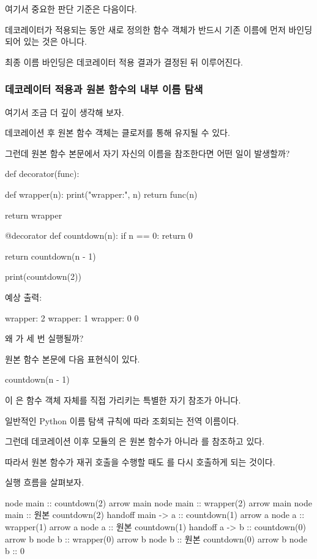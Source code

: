 여기서 중요한 판단 기준은 다음이다.

데코레이터가 적용되는 동안 새로 정의한 함수 객체가 반드시 기존 이름에 먼저 바인딩되어 있는 것은 아니다.

최종 이름 바인딩은 데코레이터 적용 결과가 결정된 뒤 이루어진다.

\subsubsection{데코레이터 적용과 원본 함수의 내부 이름 탐색}

여기서 조금 더 깊이 생각해 보자.

데코레이션 후 원본 함수 객체는 클로저를 통해 유지될 수 있다.

그런데 원본 함수 본문에서 자기 자신의 이름을 참조한다면 어떤 일이 발생할까?

\begin{dhkcode}
def decorator(func):

    def wrapper(n):
        print("wrapper:", n)
        return func(n)

    return wrapper


@decorator
def countdown(n):
    if n == 0:
        return 0

    return countdown(n - 1)


print(countdown(2))
\end{dhkcode}

예상 출력:

\begin{dhkzsh}
wrapper: 2
wrapper: 1
wrapper: 0
0
\end{dhkzsh}

왜 가 세 번 실행될까?

원본  함수 본문에 다음 표현식이 있다.

\begin{dhkcode}
countdown(n - 1)
\end{dhkcode}

이 은 함수 객체 자체를 직접 가리키는 특별한 자기 참조가 아니다.

일반적인 Python 이름 탐색 규칙에 따라 조회되는 전역 이름이다.

그런데 데코레이션 이후 모듈의 은 원본 함수가 아니라 를 참조하고 있다.

따라서 원본 함수가 재귀 호출을 수행할 때도 를 다시 호출하게 되는 것이다.

실행 흐름을 살펴보자.

\begin{dhkbranch}[in=8]
node main :: countdown(2)
arrow main
node main :: wrapper(2)
arrow main
node main :: 원본 countdown(2)
handoff main -> a :: countdown(1)
arrow a
node a :: wrapper(1)
arrow a
node a :: 원본 countdown(1)
handoff a -> b :: countdown(0)
arrow b
node b :: wrapper(0)
arrow b
node b :: 원본 countdown(0)
arrow b
node b :: 0
\end{dhkbranch}

